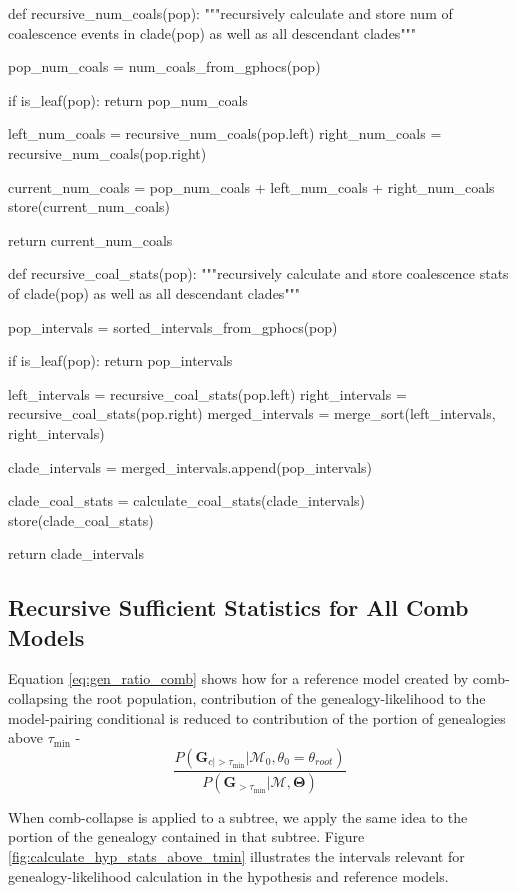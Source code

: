 \documentclass[11pt]{article}
\newcommand{\vect}[1]{\boldsymbol{\mathbf{#1}}}
\newcommand{\M}{\mathcal{M}}
\newcommand{\G}{\vect{G}}
\newcommand{\T}{\vect{\Theta}}
\newcommand{\1}{\mathbbm{1}}
\newcommand{\troot}{\theta_{root}}
\newcommand{\tmin}{\tau_{\text{min}}}
\begin{document}
\begin{python}


def recursive_num_coals(pop):
    """recursively calculate and store num of coalescence
    events in clade(pop) as well as all descendant clades"""

    pop_num_coals = num_coals_from_gphocs(pop)

    if is_leaf(pop):
        return pop_num_coals

    left_num_coals = recursive_num_coals(pop.left)
    right_num_coals = recursive_num_coals(pop.right)

    current_num_coals = pop_num_coals + left_num_coals + right_num_coals
    store(current_num_coals)

    return current_num_coals


def recursive_coal_stats(pop):
    """recursively calculate and store coalescence stats
    of clade(pop) as well as all descendant clades"""

    pop_intervals = sorted_intervals_from_gphocs(pop)

    if is_leaf(pop):
        return pop_intervals

    left_intervals = recursive_coal_stats(pop.left)
    right_intervals = recursive_coal_stats(pop.right)
    merged_intervals = merge_sort(left_intervals, right_intervals)

    clade_intervals = merged_intervals.append(pop_intervals)

    clade_coal_stats = calculate_coal_stats(clade_intervals)
    store(clade_coal_stats)

    return clade_intervals

\end{python}

\subsection{Recursive Sufficient Statistics for All Comb Models}
\label{sec:Recursive Sufficient Statistics for All Comb Models}

Equation \ref{eq:gen_ratio_comb} shows how for a reference model created by comb-collapsing the root population, contribution of the genealogy-likelihood to the model-pairing conditional is reduced to contribution of the portion of genealogies above $\tmin$ - 
\[\frac{ P({\G}_{c|>\tmin}|\M_0,\theta_0=\troot) }{ P(\G_{>\tmin}|\M,\T)}\]

When comb-collapse is applied to a subtree, we apply the same idea to the portion of the genealogy contained in that subtree. Figure \ref{fig:calculate_hyp_stats_above_tmin} illustrates the intervals relevant for genealogy-likelihood calculation in the hypothesis and reference models. 
\end{document}
